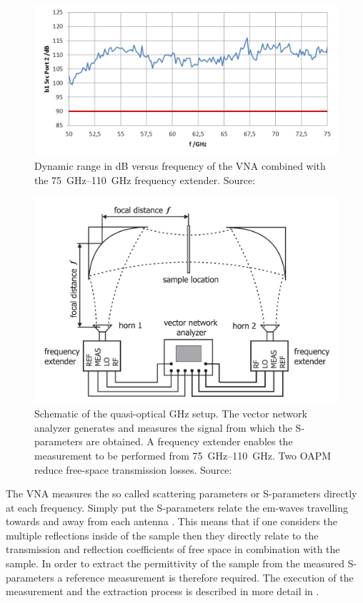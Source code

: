 \begin{figure}[H]
    \centering
    \includegraphics[scale=0.4]{images/3_chapter03/DNR.png}
    \caption{Dynamic range in dB versus frequency of the VNA combined with the \SIrange[range-phrase=--]{75}{110}{\giga \hertz} frequency extender. Source: \cite{VNADNR2013}}
    \label{fig:VNA_DNR}
\end{figure}

\begin{figure}[H]
    \centering
    \includegraphics[scale=0.4]{images/3_chapter03/ghz.png}
    \caption{Schematic of the quasi-optical GHz setup. The vector network analyzer generates and measures the signal from which the S-parameters are obtained. A frequency extender enables the measurement to be performed from \SIrange{75}{110}{\giga \hertz}. Two OAPM reduce free-space transmission losses. Source: \cite{Kazemipour2015}}
    \label{fig:GHz_setup}
\end{figure}

The VNA measures the so called scattering parameters or S-parameters directly at each frequency. Simply put the S-parameters relate the em-waves travelling towards and away from each antenna \cite{Caspers2012}. This means that if one considers the multiple reflections inside of the sample then they directly relate to the transmission and reflection coefficients of free space in combination with the sample. In order to extract the permittivity of the sample from the measured S-parameters a reference measurement is therefore required. The execution of the measurement and the extraction process is described in more detail in \cite{Kazemipour2015}. 

